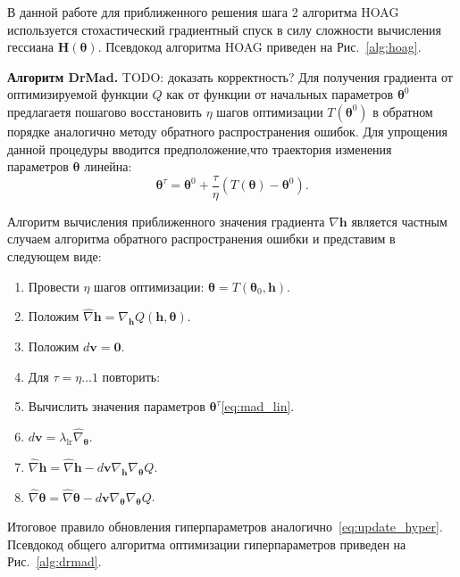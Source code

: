 В данной работе для приближенного решения  шага 2 алгоритма HOAG используется стохастический градиентный спуск в силу сложности вычисления гессиана $\mathbf{H}(\boldsymbol{\theta})$.
Псевдокод алгоритма HOAG приведен на Рис.~\ref{alg:hoag}.

\textbf{Алгоритм DrMad. }
TODO: доказать корректность?
Для получения градиента от оптимизируемой функции $Q$ как от функции от начальных параметров $\boldsymbol{\theta}^0$ предлагаетя пошагово восстановить $\eta$ шагов оптимизации $T(\boldsymbol{\theta}^0)$ в обратном порядке аналогично методу обратного распространения ошибок. Для упрощения данной процедуры вводится предположение,что траектория изменения параметров $\boldsymbol{\theta}$ линейна:
\begin{equation}
\label{eq:mad_lin}
\boldsymbol{\theta}^\tau = \boldsymbol{\theta}^0 + \frac{\tau}{\eta} (T(\boldsymbol{\theta})- \boldsymbol{\theta}^0).
\end{equation}

Алгоритм вычисления приближенного значения градиента $\nabla \mathbf{h}$ является частным случаем алгоритма обратного распространения ошибки и представим в следующем виде:
\begin{enumerate}
\item Провести $\eta$ шагов оптимизации: $\boldsymbol{\theta} = T(\boldsymbol{\theta}_0, \mathbf{h})$.
\item Положим $\hat{\nabla} \mathbf{h} = \nabla_\mathbf{h} Q( \mathbf{h}, \boldsymbol{\theta}).$ 
\item Положим $d\mathbf{v} = \mathbf{0}.$
\item Для $\tau = \eta \dots 1 $ повторить:
\item Вычислить значения параметров $\boldsymbol{\theta}^\tau$\eqref{eq:mad_lin}.
\item $d\mathbf{v} =   \lambda_{\text{lr}} \hat{\nabla}_{\boldsymbol{\theta}}$.
\item $\hat{\nabla} \mathbf{h} =  \hat{\nabla} \mathbf{h} - d\mathbf{v}\nabla_{\mathbf{h}} \nabla_{\boldsymbol{\theta}} Q$.
\item $\hat{\nabla} \boldsymbol{\theta}  = \hat{\nabla} \boldsymbol{\theta}  - d\mathbf{v}\nabla_{\boldsymbol{\theta}} \nabla_{\boldsymbol{\theta}} Q$.
\end{enumerate}

Итоговое правило обновления гиперпараметров аналогично~\eqref{eq:update_hyper}.
Псевдокод общего алгоритма оптимизации гиперпараметров приведен на Рис.~\ref{alg:drmad}.

